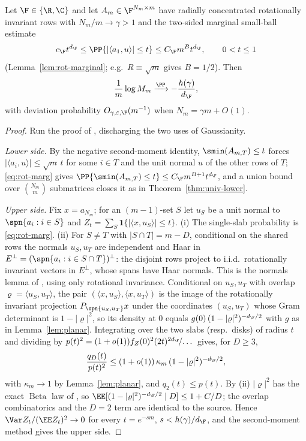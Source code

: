 \begin{theorem}\label{thm:rot-inv-univ}
Let $\F\in\{\R,\C\}$ and let $A_m\in\F^{N_m\times m}$ have radially concentrated
rotationally invariant rows with $N_m/m\to\gamma>1$ and the two-sided marginal
small-ball estimate
\begin{equation}\label{eq:rot-marg}
  c_\F t^{d_\F}\le \PP\{|\langle a_1,u\rangle|\le t\}\le C_\F m^{B}t^{d_\F},\qquad 0<t\le1
\end{equation}
(Lemma~\ref{lem:rot-marginal}; e.g.\ $R\equiv\sqrt m$ gives $B=1/2$).  Then
\[
  \frac1m\log M_m\xrightarrow{\PP}-\frac{h(\gamma)}{d_\F},
\]
with deviation probability $O_{\gamma,\varepsilon,\F}(m^{-1})$ when $N_m=\gamma m+O(1)$.
\end{theorem}

\begin{proof}
Run the proof of \cite{ShmaloExtremal2026}, discharging the two uses of
Gaussianity.

\emph{Lower side.}  By the negative second-moment identity, $\smin(A_{m,T})\le t$
forces $|\langle a_i,u\rangle|\le\sqrt m\,t$ for some $i\in T$ and the unit normal
$u$ of the other rows of $T$; \eqref{eq:rot-marg} gives
$\PP\{\smin(A_{m,T})\le t\}\le C_\F m^{B+1}t^{d_\F}$, and a union bound over
$\binom{N_m}{m}$ submatrices closes it as in Theorem~\ref{thm:univ-lower}.

\emph{Upper side.}  Fix $x=a_{N_m}$; for an $(m-1)$-set $S$ let $u_S$ be a unit
normal to $\spn\{a_i:i\in S\}$ and $Z_t=\sum_S\mathbf1\{|\langle x,u_S\rangle|\le t\}$.
(i) The single-slab probability is \eqref{eq:rot-marg}.  (ii) For $S\ne T$ with
$|S\cap T|=m-D$, conditional on the shared rows the normals $u_S,u_T$ are
independent and Haar in $E^\perp=(\spn\{a_i:i\in S\cap T\})^\perp$: the disjoint
rows project to i.i.d.\ rotationally invariant vectors in $E^\perp$, whose spans
have Haar normals.  This is the normals lemma of \cite{ShmaloExtremal2026}, using
only rotational invariance.  Conditional on $u_S,u_T$ with overlap
$\varrho=\langle u_S,u_T\rangle$, the pair $(\langle x,u_S\rangle,\langle x,u_T\rangle)$
is the image of the rotationally invariant projection $P_{\spn\{u_S,u_T\}}x$ under
the coordinates $(u_S,u_T)$ whose Gram determinant is $1-|\varrho|^2$, so its
density at $0$ equals $g(0)\,(1-|\varrho|^2)^{-d_\F/2}$ with $g$ as in
Lemma~\ref{lem:planar}.  Integrating over the two slabs (resp.\ disks) of radius
$t$ and dividing by $p(t)^2=(1+o(1))f_Z(0)^2(2t)^{2d_\F}\!/\!\dots$ gives, for $D\ge3$,
\[
  \frac{q_D(t)}{p(t)^2}\le (1+o(1))\,\kappa_m\,(1-|\varrho|^2)^{-d_\F/2},
\]
with $\kappa_m\to1$ by Lemma~\ref{lem:planar}, and $q_2(t)\le p(t)$.  By (ii)
$|\varrho|^2$ has the exact $\operatorname{Beta}$ law of \cite{ShmaloExtremal2026},
so $\EE[(1-|\varrho|^2)^{-d_\F/2}\mid D]\le1+C/D$; the overlap combinatorics and the
$D=2$ term are identical to the source.  Hence $\Var Z_t/(\EE Z_t)^2\to0$ for every
$t=e^{-sm}$, $s<h(\gamma)/d_\F$, and the second-moment method gives the upper side.
\end{proof}

